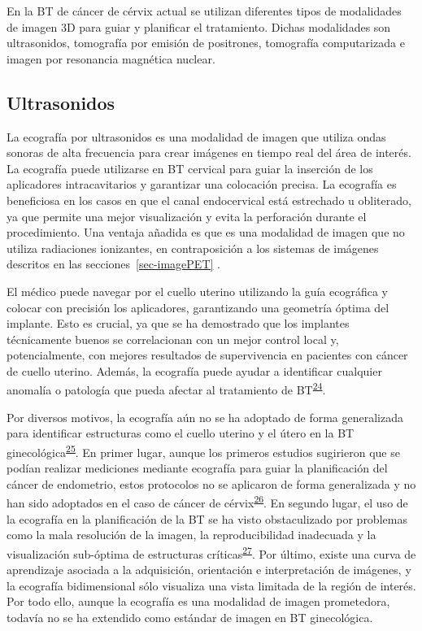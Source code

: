 \documentclass[
  a4paper,
]{scrreprt}
\begin{document}
En la BT de cáncer de cérvix actual se utilizan diferentes tipos de
modalidades de imagen 3D para guiar y planificar el tratamiento. Dichas
modalidades son ultrasonidos, tomografía por emisión de positrones,
tomografía computarizada e imagen por resonancia magnética nuclear.

\hypertarget{ultrasonidos}{%
\subsection{Ultrasonidos}\label{ultrasonidos}}

La ecografía por ultrasonidos es una modalidad de imagen que utiliza
ondas sonoras de alta frecuencia para crear imágenes en tiempo real del
área de interés. La ecografía puede utilizarse en BT cervical para guiar
la inserción de los aplicadores intracavitarios y garantizar una
colocación precisa. La ecografía es beneficiosa en los casos en que el
canal endocervical está estrechado u obliterado, ya que permite una
mejor visualización y evita la perforación durante el procedimiento. Una
ventaja añadida es que es una modalidad de imagen que no utiliza
radiaciones ionizantes, en contraposición a los sistemas de imágenes
descritos en las secciones~\ref{sec-imagePET} .

El médico puede navegar por el cuello uterino utilizando la guía
ecográfica y colocar con precisión los aplicadores, garantizando una
geometría óptima del implante. Esto es crucial, ya que se ha demostrado
que los implantes técnicamente buenos se correlacionan con un mejor
control local y, potencialmente, con mejores resultados de supervivencia
en pacientes con cáncer de cuello uterino. Además, la ecografía puede
ayudar a identificar cualquier anomalía o patología que pueda afectar al
tratamiento de
BT\textsuperscript{\protect\hyperlink{ref-dimopoulos2006}{24}}.

Por diversos motivos, la ecografía aún no se ha adoptado de forma
generalizada para identificar estructuras como el cuello uterino y el
útero en la BT
ginecológica\textsuperscript{\protect\hyperlink{ref-vandyk2021}{25}}. En
primer lugar, aunque los primeros estudios sugirieron que se podían
realizar mediciones mediante ecografía para guiar la planificación del
cáncer de endometrio, estos protocolos no se aplicaron de forma
generalizada y no han sido adoptados en el caso de cáncer de
cérvix\textsuperscript{\protect\hyperlink{ref-van2015}{26}}. En segundo
lugar, el uso de la ecografía en la planificación de la BT se ha visto
obstaculizado por problemas como la mala resolución de la imagen, la
reproducibilidad inadecuada y la visualización sub-óptima de estructuras
críticas\textsuperscript{\protect\hyperlink{ref-St-Amant2017}{27}}. Por
último, existe una curva de aprendizaje asociada a la adquisición,
orientación e interpretación de imágenes, y la ecografía bidimensional
sólo visualiza una vista limitada de la región de interés. Por todo
ello, aunque la ecografía es una modalidad de imagen prometedora,
todavía no se ha extendido como estándar de imagen en BT ginecológica.
\end{document}
